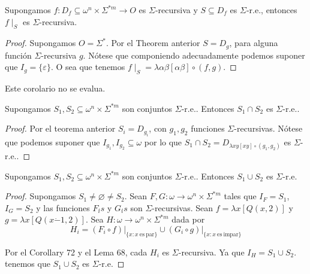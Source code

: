   \begin{corollary}
    Supongamos \(f:D_{f}\subseteq \omega ^{n}\times \Sigma ^{\ast m}\rightarrow O\) es \(\Sigma \)-recursiva y 
    \(S\subseteq D_{f}\) es \( \Sigma \)-r.e., entonces \(f\mid _{S}\) es \(\Sigma \)-recursiva.
  \begin{proof}
    Supongamos \(O=\Sigma ^{\ast }.\) Por el Theorem anterior \(S=D_{g}\), para alguna función 
    \(\Sigma \)-recursiva \(g.\) Nótese que componiendo adecuadamente podemos suponer que \(I_{g}=\{\varepsilon \}.\) 
    O sea que tenemos \(f\mid _{S}=\lambda \alpha \beta \left[ \alpha \beta \right] \circ (f,g)\).
  \end{proof}
  \end{corollary}


  \begin{corollary}
    \par Este corolario no se evalua.
  \end{corollary}

  \begin{corollary}
    Supongamos \(S_{1},S_{2}\subseteq \omega ^{n}\times \Sigma ^{\ast m}\) son conjuntos \(\Sigma \)-r.e.. 
    Entonces \(S_{1}\cap S_{2}\) es \(\Sigma \)-r.e..
  \begin{proof}
    Por el teorema anterior \(S_{i}=D_{g_{i}}\), con \(g_{1},g_{2}\) funciones \( \Sigma \)-recursivas\(.\)
    Nótese que podemos suponer que \(I_{g_{1}},I_{g_{2}} \subseteq \omega \) por lo que 
    \(S_{1}\cap S_{2}=D_{\lambda xy\left[ xy\right] \circ (g_{1},g_{2})}\) es \(\Sigma \)-r.e.\(.\)
  \end{proof}
  \end{corollary}

  \begin{corollary}
    Supongamos \(S_{1},S_{2}\subseteq \omega ^{n}\times \Sigma ^{\ast m}\) son conjuntos \(\Sigma \)-r.e.. 
    Entonces \(S_{1}\cup S_{2}\) es \(\Sigma \)-r.e.
  \begin{proof}
    Supongamos \(S_{1}\neq \varnothing \neq S_{2}.\) Sean \(F,G:\omega \rightarrow \omega ^{n}\times \Sigma ^{\ast m}\)
    tales que \(I_{F}=S_{1}\), \(I_{G}=S_{2}\) y las funciones \(F_{i} {\acute{}} s\) y \(G_{i} {\acute{}} s\) son 
    \(\Sigma \)-recursivas. Sean \(f=\lambda x\left[ Q(x,2)\right] \) y \( g=\lambda x\left[ Q(x\dot{-}1,2)\right] .\)
    Sea \(H:\omega \rightarrow \omega ^{n}\times \Sigma ^{\ast m}\) dada por
    \[
      \displaystyle H_{i}=(F_{i}\circ f)\mathrm{\mid }_{\{x:x\mathrm{\ es\ par}\}}\cup (G_{i}\circ g)
      \mathrm{\mid }_{\{x:x\mathrm{\ es\ impar}\}}
    \]

    Por el Corollary 72 y el Lema 68, cada \(H_{i}\) es \( \Sigma \)-recursiva. Ya que \(I_{H}=S_{1}\cup S_{2}\).
    tenemos que \(S_{1}\cup S_{2}\) es \(\Sigma \)-r.e.
  \end{proof}
  \end{corollary}

